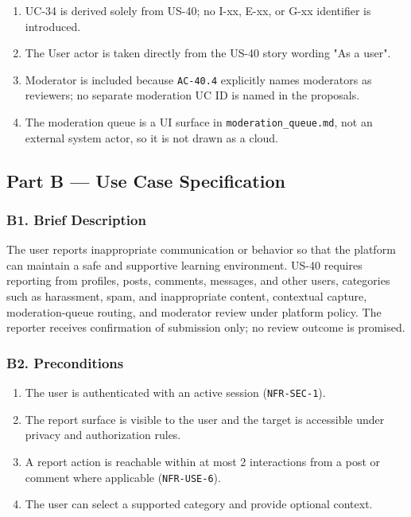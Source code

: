 \documentclass[12pt]{article}
\begin{document}
\begin{enumerate}
\item UC-34 is derived solely from US-40; no I-xx, E-xx, or G-xx identifier is introduced.
\item The User actor is taken directly from the US-40 story wording "As a user".
\item Moderator is included because \texttt{AC-40.4} explicitly names moderators as reviewers; no separate moderation UC ID is named in the proposals.
\item The moderation queue is a UI surface in \texttt{moderation\_queue.md}, not an external system actor, so it is not drawn as a cloud.
\end{enumerate}
\par\medskip

\hypertarget{sec:part-b-use-case-specification}{}
\subsection*{Part B --- Use Case Specification}
\par\medskip

\hypertarget{sec:b1-brief-description}{}
\subsubsection*{B1. Brief Description}
\par\medskip

The user reports inappropriate communication or behavior so that the platform can maintain a safe and supportive learning environment. US-40 requires reporting from profiles, posts, comments, messages, and other users, categories such as harassment, spam, and inappropriate content, contextual capture, moderation-queue routing, and moderator review under platform policy. The reporter receives confirmation of submission only; no review outcome is promised.
\par\medskip

\hypertarget{sec:b2-preconditions}{}
\subsubsection*{B2. Preconditions}
\par\medskip

\begin{enumerate}
\item The user is authenticated with an active session (\texttt{NFR-SEC-1}).
\item The report surface is visible to the user and the target is accessible under privacy and authorization rules.
\item A report action is reachable within at most 2 interactions from a post or comment where applicable (\texttt{NFR-USE-6}).
\item The user can select a supported category and provide optional context.
\end{enumerate}
\par\medskip
\end{document}
